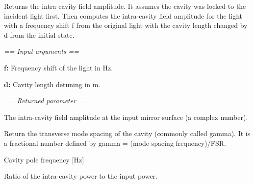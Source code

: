 \documentclass[letterpaper,10pt,english]{sphinxmanual}
\begin{document}
\begin{fulllineitems}
\begin{fulllineitems}
\end{fulllineitems}


\begin{fulllineitems}
\label{api/gtrace.optics:gtrace.optics.cavity.Cavity.intra}
Returns the intra cavity field amplitude.
It assumes the cavity was locked to the incident light first. Then computes the
intra-cavity field amplitude for the light with a frequency shift f from the original light
with the cavity length changed by d from the initial state.

\emph{== Input arguments ==}

\textbf{f:} Frequency shift of the light in Hz.

\textbf{d:} Cavity length detuning in m.

\emph{== Returned parameter ==}

The intra-cavity field amplitude at the input mirror surface (a complex number).

\end{fulllineitems}


\begin{fulllineitems}
\label{api/gtrace.optics:gtrace.optics.cavity.Cavity.modeSpacing}
Return the transverse mode spacing of the cavity (commonly called gamma).
It is a fractional number defined by gamma = (mode spacing frequency)/FSR.

\end{fulllineitems}


\begin{fulllineitems}
\label{api/gtrace.optics:gtrace.optics.cavity.Cavity.pole}
Cavity pole frequency {[}Hz{]}

\end{fulllineitems}


\begin{fulllineitems}
\label{api/gtrace.optics:gtrace.optics.cavity.Cavity.powerGain}
Ratio of the intra-cavity power to the input power.


\end{fulllineitems}
\end{fulllineitems}
\end{document}
